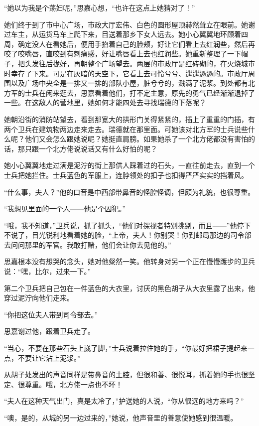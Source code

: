 \par “她以为我是个荡妇呢，”思嘉心想，“也许在这点上她猜对了！”
\par 她们终于到了市中心广场，市政大厅宏伟、白色的圆形屋顶赫然耸立在眼前。她谢过车主，从运货马车上爬下来，目送着那乡下女人远去。她小心翼翼地环顾着四周，确定没人在看她后，便用手掐着自己的脸颊，好让它们看上去红润些，然后再咬了咬嘴唇，直咬到有刺痛感，好让嘴唇看上去也红润些。她重新整理了一下帽子，把头发往后拢好，再朝整个广场望去。两层的市政厅是红砖砌的，在火烧城市时幸存了下来。可是在灰暗的天空下，它看上去可怜兮兮、邋邋遢遢的。市政厅周围以及广场中央全是一排又一排的部队小屋，脏兮兮的，溅满了泥浆。到处都有北方军的士兵在闲来逛去，思嘉看着他们，打不定主意，原先的勇气已经渐渐退掉了一些。在这敌人的营地里，她如何才能四处去寻找瑞德的下落呢？
\par 她朝沿街的消防站望去，看到那宽大的拱形门关得紧紧的，插上了重重的门插，有两个卫兵在建筑物两边走来走去。瑞德就在那里面。可她该对北方军的士兵说些什么呢？他们又会怎么跟她说呢？她挺直肩膀。如果她杀了一个北方佬都没有害怕的话，那只跟一个北方佬说说话又有什么好怕的呢？
\par 她小心翼翼地走过满是泥泞的街上那供人踩着过的石头，一直往前走去，直到一个士兵把她拦住。士兵蓝色的军服上，连脖领处的扣子也扣得严严实实的挡着风。
\par “什么事，夫人？”他的口音是中西部带鼻音的怪腔怪调，但颇为礼貌，也很尊重。
\par “我想见里面的一个人——他是个囚犯。”
\par “哦，我不知道，”卫兵说，抓了抓头，“他们对探视者特别挑剔，而且——”他停下不说了，目光锐利地看着她的脸，“上帝，夫人！你别哭！你到邮局那边的司令部去问问那里的军官。我敢打赌，他们会让你去见他的。”
\par 思嘉根本没有想哭的念头，她对他粲然一笑。他转身对另一个正在慢慢踱步的卫兵说：“嘿，比尔，过来一下。”
\par 第二个卫兵把自己包在一件蓝色的大衣里，讨厌的黑色胡子从大衣里露了出来，他穿过泥泞向他们走来。
\par “你把这位夫人带到司令部去。”
\par 思嘉谢过他，跟着卫兵走了。
\par “当心，不要在那些石头上崴了脚，”士兵说着拉住她的手，“你最好把裙子提起来一点，不要让它沾上泥浆。”
\par 从胡子处发出的声音同样是带鼻音的土腔，但很和善、很悦耳，抓着她的手也很坚定、很尊重。哦，北方佬一点也不坏！
\par “夫人在这种天气出门，真是太冷了，”护送她的人说，“你从很远的地方来吗？”
\par “噢，是的，从城的另一边过来的，”她说，他声音里的善意使她感到很温暖。
